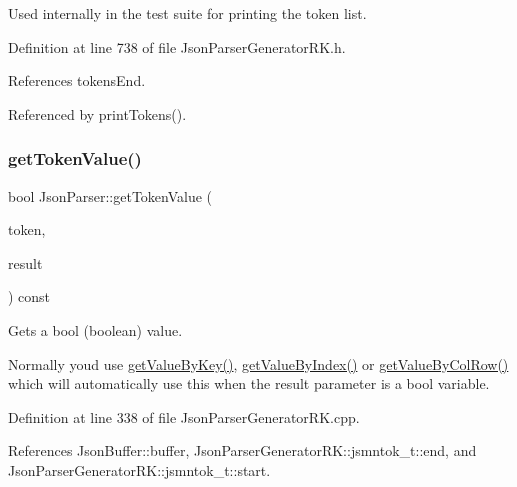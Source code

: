 Used internally in the test suite for printing the token list. 



Definition at line 738 of file Json\+Parser\+Generator\+R\+K.\+h.



References tokens\+End.



Referenced by print\+Tokens().

\mbox{\label{class_json_parser_a5f9e5c2453307a99a54fcf26fbd68dd4}} 
\subsubsection{\texorpdfstring{get\+Token\+Value()}{getTokenValue()}\hspace{0.1cm}{\footnotesize\ttfamily [1/8]}}
{\footnotesize\ttfamily bool Json\+Parser\+::get\+Token\+Value (\begin{DoxyParamCaption}\item[{const \hyperlink{struct_json_parser_generator_r_k_1_1jsmntok__t}{Json\+Parser\+Generator\+R\+K\+::jsmntok\+\_\+t} $\ast$}]{token,  }\item[{bool \&}]{result }\end{DoxyParamCaption}) const}



Gets a bool (boolean) value. 

Normally you\textquotesingle{}d use \hyperlink{class_json_parser_a13abcdcb2341f65ac358bb4d81007d06}{get\+Value\+By\+Key()}, \hyperlink{class_json_parser_a53bd8a6ebb0d9b246b876653e792368f}{get\+Value\+By\+Index()} or \hyperlink{class_json_parser_af1f4a3a65b5cc9cd19b129c410aa78e0}{get\+Value\+By\+Col\+Row()} which will automatically use this when the result parameter is a bool variable. 

Definition at line 338 of file Json\+Parser\+Generator\+R\+K.\+cpp.



References Json\+Buffer\+::buffer, Json\+Parser\+Generator\+R\+K\+::jsmntok\+\_\+t\+::end, and Json\+Parser\+Generator\+R\+K\+::jsmntok\+\_\+t\+::start.

\mbox{\label{class_json_parser_a875e5b4b01c9cd597e09b13e59fe6252}} 
